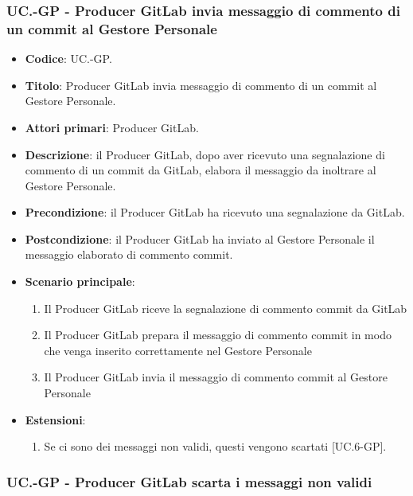 		\subsubsection{UC\theuccount.\thesubuccount-GP - Producer GitLab invia messaggio di commento di un commit al Gestore Personale}
		\begin{itemize}
			\item \textbf{Codice}: UC\theuccount.\thesubuccount-GP.
			\item \textbf{Titolo}: Producer GitLab invia messaggio di commento di un commit al Gestore Personale.
			\item \textbf{Attori primari}: Producer GitLab.
			\item \textbf{Descrizione}: il Producer GitLab, dopo aver ricevuto una segnalazione di commento di un commit da GitLab, elabora il messaggio da inoltrare al Gestore Personale.
			\item \textbf{Precondizione}: il Producer GitLab ha ricevuto una segnalazione da GitLab.
			\item \textbf{Postcondizione}: il Producer GitLab ha inviato al Gestore Personale il messaggio
			elaborato di commento commit.
			\item \textbf{Scenario principale}:
			\begin{enumerate}
				\item Il Producer GitLab riceve la segnalazione di commento commit da GitLab
				\item Il Producer GitLab prepara il messaggio di commento commit in modo che venga inserito correttamente nel Gestore Personale
				\item Il Producer GitLab invia il messaggio di commento commit al Gestore Personale
			\end{enumerate}
			\item \textbf{Estensioni}:
			\begin{enumerate}
				\item Se ci sono dei messaggi non validi, questi vengono scartati [UC\theuccount.6-GP].
			\end{enumerate}
		\end{itemize}


		\subsubsection{UC\theuccount.\thesubuccount-GP - Producer GitLab scarta i messaggi non validi}

